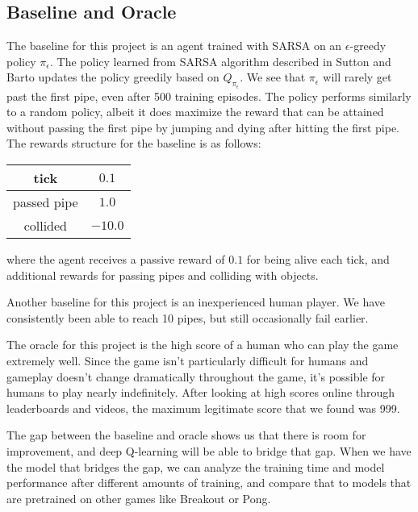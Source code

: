 \documentclass{article}
\begin{document}
\subsection{Baseline and Oracle}
The baseline for this project is an agent trained with SARSA on an $\epsilon$-greedy policy $\pi_{\epsilon}$.
The policy learned from SARSA algorithm described in Sutton and Barto updates the policy greedily based on $Q_{\pi_{\epsilon}}$. \cite{rl}
We see that $\pi_{\epsilon}$ will rarely get past the first pipe, even after 500 training episodes.
The policy performs similarly to a random policy, albeit it does maximize the reward that can be attained without passing the first pipe by jumping and dying after hitting the first pipe.
The rewards structure for the baseline is as follows:
\begin{center}
\begin{tabular} { | c | c | }
    \hline
    tick & $0.1$ \\
    \hline
    passed pipe & $1.0$ \\
    \hline
    collided & $-10.0$ \\
    \hline
\end{tabular}
\end{center}
where the agent receives a passive reward of $0.1$ for being alive each tick, and additional rewards for passing pipes and colliding with objects.

Another baseline for this project is an inexperienced human player. 
We have consistently been able to reach 10 pipes, but still occasionally fail earlier.

The oracle for this project is the high score of a human who can play the game extremely well.
Since the game isn't particularly difficult for humans and gameplay doesn't change dramatically throughout the game, it's possible for humans to play nearly indefinitely.
After looking at high scores online through leaderboards and videos, the maximum legitimate score that we found was 999. 

The gap between the baseline and oracle shows us that there is room for improvement, and deep Q-learning will be able to bridge that gap.
When we have the model that bridges the gap, we can analyze the training time and model performance after different amounts of training, and compare that to models that are pretrained on other games like Breakout or Pong.




\end{document}

